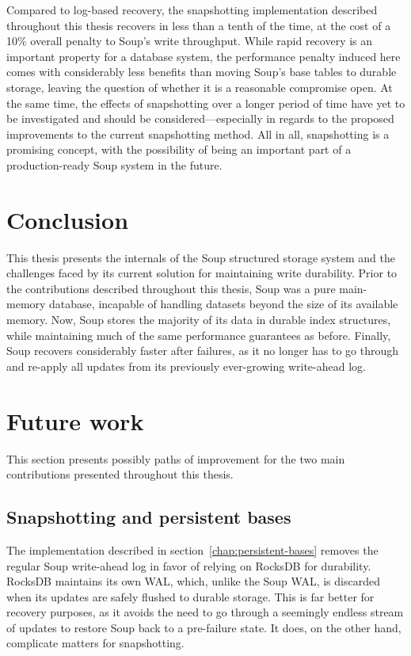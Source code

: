 Compared to log-based recovery, the snapshotting implementation described
throughout this thesis recovers in less than a tenth of the time, at the cost of
a 10\% overall penalty to Soup's write throughput. While rapid recovery is an
important property for a database system, the performance penalty induced here
comes with considerably less benefits than moving Soup's base tables to durable
storage, leaving the question of whether it is a reasonable compromise open. At
the same time, the effects of snapshotting over a longer period of time have yet
to be investigated and should be considered---especially in regards to the
proposed improvements to the current snapshotting method. All in all,
snapshotting is a promising concept, with the possibility of being an important
part of a production-ready Soup system in the future.

\section{Conclusion}

This thesis presents the internals of the Soup structured storage system and the
challenges faced by its current solution for maintaining write durability. Prior
to the contributions described throughout this thesis, Soup was a pure
main-memory database, incapable of handling datasets beyond the size of its
available memory. Now, Soup stores the majority of its data in durable index
structures, while maintaining much of the same performance guarantees as before.
Finally, Soup recovers considerably faster after failures, as it no longer has
to go through and re-apply all updates from its previously ever-growing
write-ahead log.

\section{Future work}\label{sec:future-work}

This section presents possibly paths of improvement for the two main
contributions presented throughout this thesis.

\subsection{Snapshotting and persistent bases}

The  implementation described in
section~\ref{chap:persistent-bases} removes the regular Soup write-ahead log in
favor of relying on RocksDB for durability. RocksDB maintains its own WAL,
which, unlike the Soup WAL, is discarded when its updates are safely flushed to
durable storage. This is far better for recovery purposes, as it avoids the need
to go through a seemingly endless stream of updates to restore Soup back to a
pre-failure state. It does, on the other hand, complicate matters for
snapshotting.

